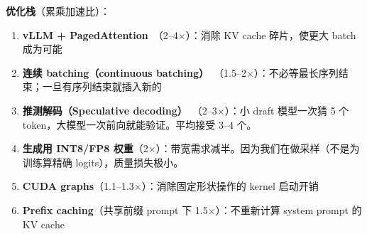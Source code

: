 \textbf{优化栈}（累乘加速比）：

\begin{enumerate}
  \item \textbf{vLLM + PagedAttention}~\cite{kwon2023efficient}（2--4$\times$）：消除 KV cache 碎片，使更大 batch 成为可能
  \item \textbf{连续 batching（continuous batching）}~\cite{yu2022orca}（1.5--2$\times$）：不必等最长序列结束；一旦有序列结束就插入新的
  \item \textbf{推测解码（Speculative decoding）}~\cite{leviathan2023fast}（2--3$\times$）：小 draft 模型一次猜 5 个 token，大模型一次前向就能验证。平均接受 3--4 个。
  \item \textbf{生成用 INT8/FP8 权重}（2$\times$）：带宽需求减半。因为我们在做采样（不是为训练算精确 logits），质量损失极小。
  \item \textbf{CUDA graphs}（1.1--1.3$\times$）：消除固定形状操作的 kernel 启动开销
  \item \textbf{Prefix caching}（共享前缀 prompt 下 1.5$\times$）：不重新计算 system prompt 的 KV cache
\end{enumerate}

